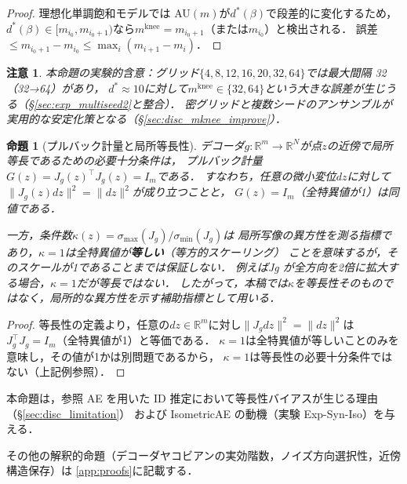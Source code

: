 \documentclass[11pt,a4paper]{jsarticle}
\newtheorem{proposition}{命題}
\newtheorem{remark}{注意}
\newcommand{\Jg}{J_g}
\newcommand{\R}{\mathbb{R}}
\newcommand{\kap}{\kappa}
\newcommand{\mknee}{m^{\mathrm{knee}}}
\begin{document}
\begin{proof}
理想化単調飽和モデルでは AU$(m)$が$d^*(\beta)$で段差的に変化するため，
$d^*(\beta) \in [m_{i_0}, m_{i_0+1})$なら$\mknee = m_{i_0+1}$（または$m_{i_0}$）と検出される．
誤差$\leq m_{i_0+1} - m_{i_0} \leq \max_i(m_{i+1}-m_i)$．
\end{proof}

\begin{remark}
本命題の実験的含意：グリッド$\{4,8,12,16,20,32,64\}$では最大間隔 32（32→64）があり，
$d^* \approx 10$に対して$\mknee \in \{32, 64\}$という大きな誤差が生じうる（§\ref{sec:exp_multiseed2}と整合）．
密グリッドと複数シードのアンサンブルが実用的な安定化策となる（§\ref{sec:disc_mknee_improve}）．
\end{remark}

\begin{proposition}[プルバック計量と局所等長性]\label{thm:pullback}
デコーダ$g: \R^m \to \R^N$が点$z$の近傍で局所等長であるための必要十分条件は，
プルバック計量$G(z) = \Jg(z)^\top \Jg(z) = I_m$である．
すなわち，任意の微小変位$dz$に対して$\|\Jg(z)dz\|^2 = \|dz\|^2$が成り立つことと，
$G(z)=I_m$（全特異値が1）は同値である．

一方，条件数$\kap(z) = \sigma_{\max}(\Jg) / \sigma_{\min}(\Jg)$は
局所写像の異方性を測る指標であり，$\kap = 1$は全特異値が\textbf{等しい}（等方的スケーリング）
ことを意味するが，そのスケールが1であることまでは保証しない．
例えばJg が全方向を2倍に拡大する場合，$\kap=1$だが等長ではない．
したがって，本稿では$\kap$を等長性そのものではなく，局所的な異方性を示す補助指標として用いる．
\end{proposition}

\begin{proof}
等長性の定義より，任意の$dz \in \R^m$に対し$\|J_g dz\|^2 = \|dz\|^2$は
$J_g^\top J_g = I_m$（全特異値が1）と等価である．
$\kap = 1$は全特異値が等しいことのみを意味し，その値が1かは別問題であるから，
$\kap=1$は等長性の必要十分条件ではない（上記例参照）．
\end{proof}

本命題は，参照 AE を用いた ID 推定において等長性バイアスが生じる理由（§\ref{sec:disc_limitation}）
および IsometricAE の動機（実験 Exp-Syn-Iso）を与える．

その他の解釈的命題（デコーダヤコビアンの実効階数，ノイズ方向選択性，近傍構造保存）は
\ref{app:proofs}に記載する．

\end{document}
